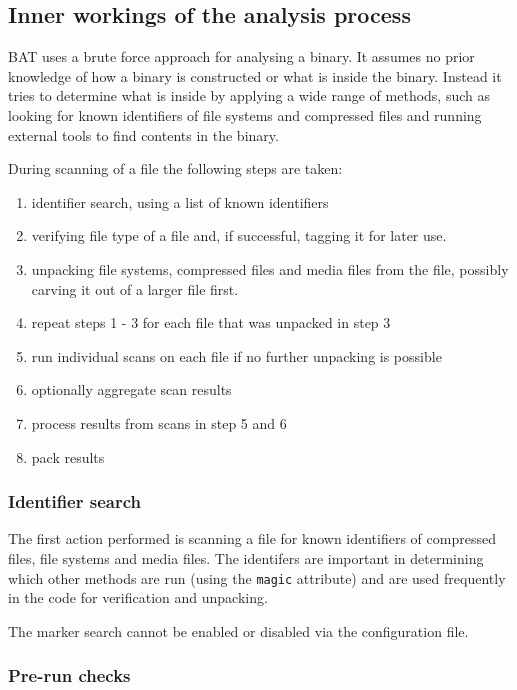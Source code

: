 \documentclass[10pt]{article}
\begin{document}
\subsection{Inner workings of the analysis process}

BAT uses a brute force approach for analysing a binary. It assumes no prior
knowledge of how a binary is constructed or what is inside the binary. Instead
it tries to determine what is inside by applying a wide range of methods, such
as looking for known identifiers of file systems and compressed files and
running external tools to find contents in the binary.

During scanning of a file the following steps are taken:

\begin{enumerate}
\item identifier search, using a list of known identifiers
\item verifying file type of a file and, if successful, tagging it for later
use.
\item unpacking file systems, compressed files and media files from the file,
possibly carving it out of a larger file first.
\item repeat steps 1 - 3 for each file that was unpacked in step 3
\item run individual scans on each file if no further unpacking is possible
\item optionally aggregate scan results
\item process results from scans in step 5 and 6
\item pack results
\end{enumerate}

\subsubsection{Identifier search}

The first action performed is scanning a file for known identifiers of
compressed files, file systems and media files. The identifers are important
in determining which other methods are run (using the \texttt{magic}
attribute) and are used frequently in the code for verification and unpacking.

The marker search cannot be enabled or disabled via the configuration file.

\subsubsection{Pre-run checks}
\end{document}
